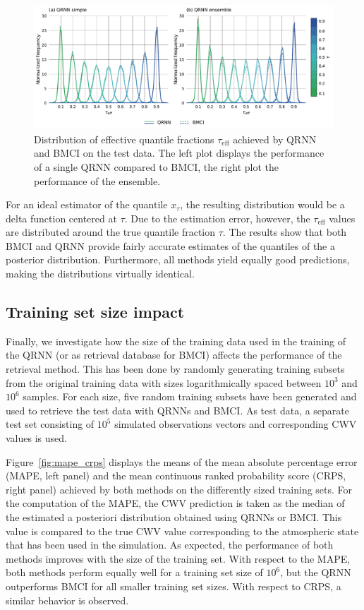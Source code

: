 \documentclass[journal abbreviation, manuscript]{copernicus}
\begin{document}
  \begin{figure}[hbpt!]
    \centering
    \includegraphics[width = 0.8\linewidth]{../plots/quantile_fractions}
    \caption{Distribution of effective quantile fractions $\tau_\text{eff}$ achieved by
      QRNN and BMCI on the test data. The left plot displays the performance of a
      single QRNN compared to BMCI, the right plot the performance of the ensemble.}
    \label{fig:quantile_fractions}
  \end{figure}

  For an ideal estimator of the quantile $x_\tau$, the resulting distribution
  would be a delta function centered at $\tau$. Due to the estimation error,
  however, the $\tau_{\text{eff}}$ values are distributed around the true quantile
  fraction $\tau$. The results show that both BMCI and QRNN provide fairly
  accurate estimates of the quantiles of the a posterior distribution. Furthermore,
  all methods  yield equally good predictions, making the distributions virtually
  identical.

\subsection{Training set size impact}

Finally, we investigate how the size of the training data used in the training
of the QRNN (or as retrieval database for BMCI) affects the performance of the
retrieval method. This has been done by randomly generating training subsets
from the original training data with sizes logarithmically spaced between $10^3$
and $10^6$ samples. For each size, five random training subsets have been
generated and used to retrieve the test data with QRNNs and BMCI. As test data,
a separate test set consisting of $10^5$ simulated observations vectors and
corresponding CWV values is used.

Figure~\ref{fig:mape_crps} displays the means of the mean absolute percentage
error (MAPE, left panel) and the mean continuous ranked probability score (CRPS,
right panel) achieved by both methods on the differently sized training sets.
For the computation of the MAPE, the CWV prediction is taken as the median of
the estimated a posteriori distribution obtained using QRNNs or BMCI. This value
is compared to the true CWV value corresponding to the atmospheric state that
has been used in the simulation. As expected, the performance of both methods
improves with the size of the training set. With respect to the MAPE, both
methods perform equally well for a training set size of $10^6$, but the QRNN
outperforms BMCI for all smaller training set sizes. With respect to CRPS, a
similar behavior is observed.
\end{document}

